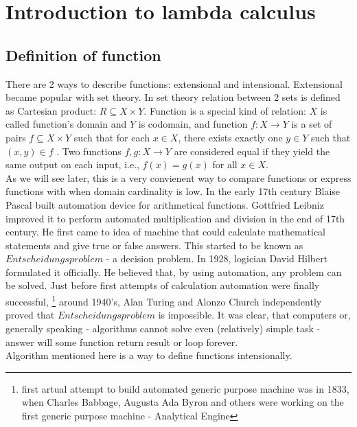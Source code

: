 


\chapter{Introduction to lambda calculus}

\section{Definition of function}

There are 2 ways to describe functions: extensional and intensional. Extensional became popular with set theory. 
In set theory relation between 2 sets is defined as Cartesian product: $R \subseteq X \times Y$. Function
is a special kind of relation:
$X$ is called function's domain and $Y$ is codomain, and function $f : X \rightarrow Y$ 
is a set of pairs $f \subseteq X \times Y$ such that for each $x \in X$, there exists exactly one 
$y \in Y$ such that $(x, y) \in f$ . Two functions $f, g : X \rightarrow Y$ are
considered equal if they yield the same output on each input, i.e., $f(x) = g(x)$ for all $x \in X$.
\\
As we will see later, this is a very convienent way to compare functions or express functions with when domain cardinality is low.
In the early 17th century Blaise Pascal built automation device for arithmetical functions. Gottfried Leibniz improved it
to perform automated multiplication and division in the end of 17th century. He first came to idea of machine that could 
calculate mathematical statements and give true or false answers. This started to be known as $Entscheidungsproblem$ - a decision
problem. In 1928, logician David Hilbert formulated it officially. He believed that, by using automation, any problem can be solved.
Just before first attempts of calculation automation were finally successful,
\footnote{first artual attempt to build automated generic purpose machine was in 1833, when Charles Babbage, Augusta Ada Byron and 
others were working on the first generic purpose machine - Analytical Engine}
around 1940's, Alan Turing and Alonzo Church independently proved that $Entscheidungsproblem$ is impossible. It was clear, that
computers or, generally speaking - algorithms cannot solve even (relatively) simple task - answer will some function return result
or loop forever.
\\
Algorithm mentioned here is a way to define functions intensionally.


